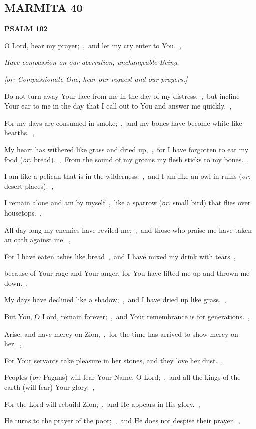 \documentclass[12pt,twoside,a5paper]{article}
\newcommand{\marmita}[1]{\subsection*{MARMITA {#1}}}
\newcommand{\psalm}[1]{\textbf{PSALM {#1}}\nopagebreak}
\newcommand{\qanona}[1]{{\liturgicalhint{Qanona.} \emph{#1}}}
\newcommand{\translationoption}[1]{\emph{or:} #1}
\begin{document}
\marmita{40}

\psalm{102}

\begin{normalparskip}
  O Lord, hear my prayer;~\sep\ and let my cry enter to You.~\sep

  \qanona{Have compassion on our aberration, unchangeable Being.}

  \emph{[or: Compassionate One, hear our request and our prayers.]}

  Do not turn away Your face from me in the day of my distress,~\sep\ but incline Your ear to me in the day that I call out to You and answer me quickly.~\sep

  For my days are consumed in smoke;~\sep\ and my bones have become white like hearths.~\sep

  My heart has withered like grass and dried up,~\sep\ for I have forgotten to eat my food (\translationoption{bread}).~\sep\ From the sound of my groans my flesh sticks to my bones.~\sep

  I am like a pelican that is in the wilderness;~\sep\ and I am like an owl in ruins (\translationoption{desert places}).~\sep

  I remain alone and am by myself~\sep\ like a sparrow (\translationoption{small bird}) that flies over housetops.~\sep

  All day long my enemies have reviled me;~\sep\ and those who praise me have taken an oath against me.~\sep

  For I have eaten ashes like bread~\sep\ and I have mixed my drink with tears~\sep

  because of Your rage and Your anger, for You have lifted me up and thrown me down.~\sep

  My days have declined like a shadow;~\sep\ and I have dried up like grass.~\sep

  But You, O Lord, remain forever;~\sep\ and Your remembrance is for generations.~\sep

  Arise, and have mercy on Zion,~\sep\ for the time has arrived to show mercy on her.~\sep

  For Your servants take pleasure in her stones, and they love her dust.~\sep

  Peoples (\translationoption{Pagans}) will fear Your Name, O Lord;~\sep\ and all the kings of the earth (will fear) Your glory.~\sep

  For the Lord will rebuild Zion;~\sep\ and He appears in His glory.~\sep

  He turns to the prayer of the poor;~\sep\ and He does not despise their prayer.~\sep


\end{normalparskip}
\end{document}
